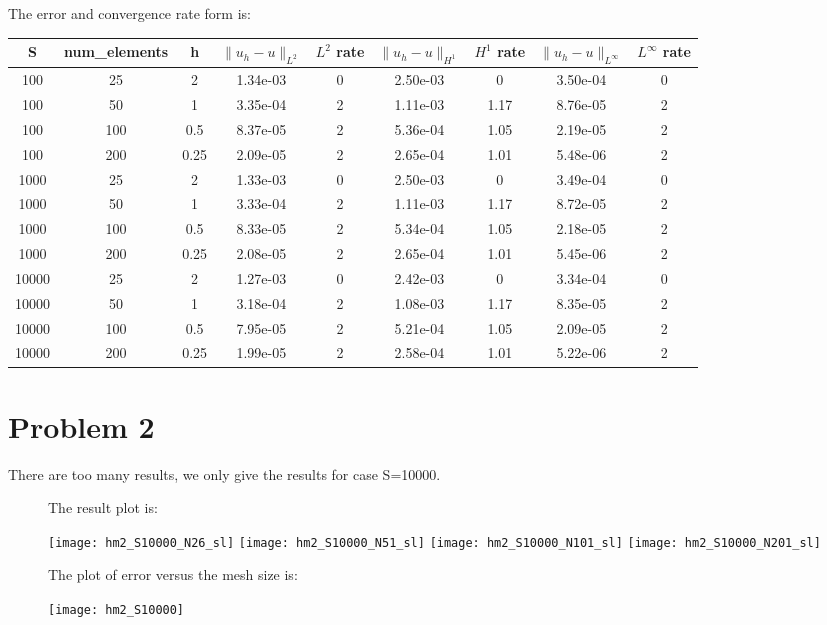 \documentclass[11pt]{article}
\begin{document}
\begin{table}
The error and convergence rate form is:\\
\begin{center}
\begin{tabular}{|c|c|c|c|c|c|c|c|c|} 
	\hline
S & num\_elements  & h & $\|u_h-u\|_{L^{2}}$ & $L^{2}$ rate & $\|u_h-u\|_{H^{1}}$ & $H^{1}$ rate & $\|u_h-u\|_{L^{\infty}}$ & $L^{\infty}$ rate  \\ \hline
   100 &  25   &   2  &  1.34e-03   &  0     &   2.50e-03 & 0 & 3.50e-04 & 0 \\
   100 &  50   &   1 &  3.35e-04   &  2     &   1.11e-03 & 1.17 & 8.76e-05 & 2 \\
   100 &  100   &   0.5  &  8.37e-05   &  2     &   5.36e-04 & 1.05 & 2.19e-05 & 2 \\
   100 & 200   &   0.25  &  2.09e-05   &  2     &   2.65e-04 & 1.01 & 5.48e-06 & 2 \\
   1000 &  25   &   2  &  1.33e-03   &  0     &   2.50e-03 & 0 & 3.49e-04 & 0 \\
   1000 &  50   &   1 &  3.33e-04   &  2     &   1.11e-03 & 1.17 & 8.72e-05 & 2 \\
   1000 &  100   &   0.5  &  8.33e-05  &  2     &   5.34e-04 & 1.05 & 2.18e-05 & 2 \\
   1000 & 200   &   0.25  &  2.08e-05  &  2     &   2.65e-04 & 1.01 & 5.45e-06 & 2 \\
   10000 &  25   &   2  &  1.27e-03   &  0     &   2.42e-03 & 0 & 3.34e-04 & 0 \\
   10000 &  50   &   1 &  3.18e-04   &  2     &   1.08e-03 & 1.17 & 8.35e-05 & 2 \\
   10000 &  100   &   0.5  &  7.95e-05   &  2     &   5.21e-04 & 1.05 & 2.09e-05 & 2 \\
   10000 & 200   &   0.25  &  1.99e-05   &  2     &   2.58e-04 & 1.01 & 5.22e-06 & 2 \\
	\hline
\end{tabular}
\end{center}
\end{table}

\newpage
\section{Problem 2}
There are too many results, we only give the results for case S=10000.\\ 
\begin{figure}
	The result plot is:\\
	\begin{center}
		\centering
		\texttt{[image: hm2\_S10000\_N26\_sl]}
		\texttt{[image: hm2\_S10000\_N51\_sl]}
		\texttt{[image: hm2\_S10000\_N101\_sl]}
		\texttt{[image: hm2\_S10000\_N201\_sl]}		
	\end{center}

	The plot of error versus the mesh size is:\\
	\begin{center}
		\centering
		\texttt{[image: hm2\_S10000]}	
	\end{center}
\end{figure}
\end{document}
